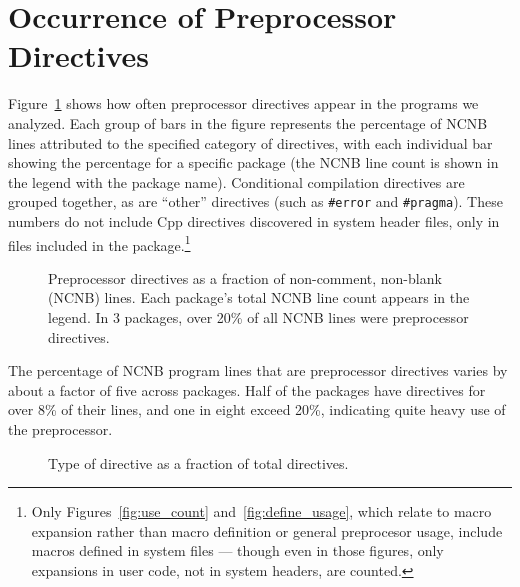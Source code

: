 \documentclass[11pt]{article}
\begin{document}


\section{Occurrence of Preprocessor Directives}
\label{sec:directives}

Figure~\ref{fig:directives_per_ncnb} shows how often preprocessor
directives appear in the programs we analyzed.  Each group of bars in the
figure represents the percentage of NCNB lines attributed to the specified
category of directives, with each individual bar showing the percentage for
a specific package (the NCNB line count is shown in the legend with the
package name).  Conditional compilation directives are grouped together, as
are ``other'' directives (such as {\tt \#error} and {\tt \#pragma}).  These
numbers do not include Cpp directives discovered in system header files,
only in files included in the package.\footnote{Only
  Figures~\ref{fig:use_count} and~\ref{fig:define_usage}, which relate to
  macro expansion rather than macro definition or general preprocesor
  usage, include macros defined in system files --- though even in those
  figures, only expansions in user code, not in system headers, are counted.}


\begin{figure}
\centerline{}
\caption{Preprocessor directives as a fraction of non-comment,
  non-blank (NCNB) lines.  Each package's total NCNB line count appears
  in the legend.  In 3 packages, over 20\% of all NCNB lines were
  preprocessor directives.}
\label{fig:directives_per_ncnb}
\end{figure}

The percentage of NCNB program lines that are preprocessor directives
varies by about a factor of five across packages.  Half of the packages
have directives for over 8\% of their lines, and one in eight exceed 20\%,
indicating quite heavy use of the preprocessor.

\begin{figure}
\centerline{}
\caption{Type of directive as a fraction of total directives.}
\label{fig:total_directives}
\end{figure}
\end{document}
